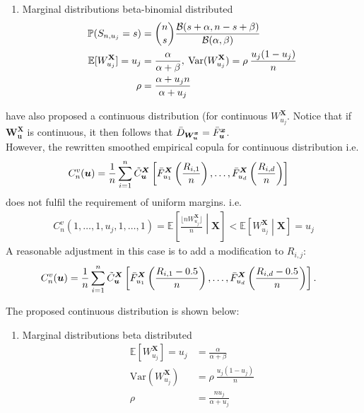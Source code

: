 \documentclass[12pt]{report}
\newcommand{\1}{\mathbf{1}}
\begin{document}
\begin{flushleft}
\begin{enumerate}
\item Marginal distributions beta-binomial distributed
\begin{align*}
\mathbb{P} ( S_{n,u_{j}} = s) &= \dbinom{n}{s} \frac{\mathcal{B}(s + \alpha, n - s + \beta)}{\mathcal{B}(\alpha,\beta)} \\
\mathbb{E}[W^{\textbf{X}}_{u_{j}}] = u_{j} &= \frac{\alpha}{\alpha + \beta}, \: \mathrm{Var}(W^{\textbf{X}}_{u_{j}}) = \rho \: \frac{u_{j} (1 - u_{j})}{n} \\
\rho &= \frac{\alpha + u_{j}n}{\alpha + u_{j}}
\end{align*}
\end{enumerate}
\cite{KojadinovicYi2024Smooth} have also proposed a continuous distribution (for continuous $W^{\boldsymbol{X}}_{u_{j}}$. Notice that if $\boldsymbol{W^{X}_{u}}$ is continuous, it then follows that $\Bar{D}_{\boldsymbol{W^{x}_{u}}} = \Bar{F}^{\boldsymbol{x}}_{\boldsymbol{u}}$. \\
\vspace{0.5cm}
However, the rewritten smoothed empirical copula for continuous distribution i.e.
\begin{align*}
C_{n}^{v}(\boldsymbol{u}) &= \frac{1}{n} \sum\limits_{i = 1}^{n} \Tilde{C}_{\boldsymbol{u}}^{\boldsymbol{X}} \left[\Bar{F}_{u_{1}}^{\boldsymbol{X}}\left(\frac{R_{i,1}}{n}\right), \dots, \Bar{F}_{u_{d}}^{\boldsymbol{X}}\left(\frac{R_{i,d}}{n}\right) \right]
\end{align*}
does not fulfil the requirement of uniform margins. i.e. 
\begin{align*}
C_{n}^{v}(1, \dots, 1, u_{j}, 1, \dots, 1) = \mathbb{E} \left[ \frac{\lfloor nW^{\boldsymbol{X}}_{u_{j}} \rfloor}{n} \middle| \boldsymbol{X} \right] < \mathbb{E} \left[ W^{\boldsymbol{X}}_{u_{j}} \middle| \boldsymbol{X} \right] = u_{j}
\end{align*}
A reasonable adjustment in this case is to add a modification to $R_{i,j}$:
\begin{align*}
C_{n}^{v}(\boldsymbol{u}) &= \frac{1}{n} \sum\limits_{i = 1}^{n} \Tilde{C}_{\boldsymbol{u}}^{\boldsymbol{X}} \left[\Bar{F}_{u_{1}}^{\boldsymbol{X}}\left(\frac{R_{i,1} - 0.5}{n}\right), \dots, \Bar{F}_{u_{d}}^{\boldsymbol{X}}\left(\frac{R_{i,d} - 0.5}{n}\right) \right].
\end{align*}

\newpage
The proposed continuous distribution is shown below:
\begin{enumerate}
\item Marginal distributions beta distributed
\begin{align*}
\mathbb{E}[W^{\boldsymbol{X}}_{u_{j}}] = u_{j} &= \frac{\alpha}{\alpha + \beta} \\
\mathrm{Var}(W^{\boldsymbol{X}}_{u_{j}}) &= \rho \: \frac{u_{j} (1 - u_{j})}{n}\\
\rho &= \frac{n u_{j}}{\alpha + u_{j}}
\end{align*}
\end{enumerate}


\end{flushleft}
\end{document}
